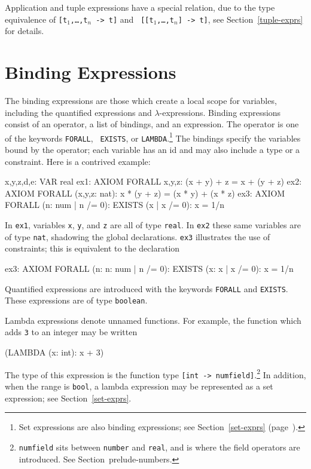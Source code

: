 Application and tuple expressions have a special relation, due to the
type equivalence of \texttt{[t$_1$,\ldots,t$_n$ -> t]} and \texttt{
[[t$_1$,\ldots,t$_n$] -> t]}, see Section~\ref{tuple-exprs} for details.

\section{Binding Expressions}\label{binding-expressions}

The binding expressions are those which create a local scope for
variables, including the quantified expressions and
$\lambda$-expressions.  Binding expressions consist of an operator, a
list of bindings, and an expression.  The operator is one of the
keywords \texttt{FORALL}, \texttt{
EXISTS}, or \texttt{LAMBDA}.\footnote{Set
expressions are also binding expressions; see Section~\ref{set-exprs} (page~\pageref{set-exprs}).}
The bindings specify the variables bound by the operator; each variable
has an id and may also include a type or a constraint.  Here is a
contrived example:
\begin{pvsex}
  x,y,z,d,e: VAR real
  ex1: AXIOM FORALL x,y,z: (x + y) + z = x + (y + z)
  ex2: AXIOM FORALL (x,y,z: nat): x * (y + z) = (x * y) + (x * z)
  ex3: AXIOM FORALL (n: num | n /= 0): EXISTS (x | x /= 0): x = 1/n
\end{pvsex}
%
In \texttt{ex1}, variables \texttt{x}, \texttt{y}, and \texttt{z} are all of type
\texttt{real}.  In \texttt{ex2} these same variables are of type \texttt{nat},
shadowing the global declarations.  \texttt{ex3} illustrates
the use of constraints; this is equivalent to the declaration
\begin{pvsex}
  ex3: AXIOM FORALL (n: \setb{}n: num | n /= 0\sete):
               EXISTS (x: \setb{}x | x /= 0\sete): x = 1/n
\end{pvsex}

Quantified expressions are introduced with
the keywords \texttt{FORALL} and \texttt{EXISTS}.  These expressions are
of type \texttt{boolean}.

Lambda expressions denote unnamed functions.
For example, the function which adds \texttt{3} to an integer may be
written
\begin{pvsex}
  (LAMBDA (x: int): x + 3)
\end{pvsex}
%
The type of this expression is the function type \texttt{[int ->
numfield]}.\footnote{\texttt{numfield} sits between \texttt{number} and
\texttt{real}, and is where the field operators are introduced.  See
Section~{prelude-numbers}.}  In addition, when the range is \texttt{bool},
a lambda expression may be represented as a set expression; see
Section~\ref{set-exprs}.

